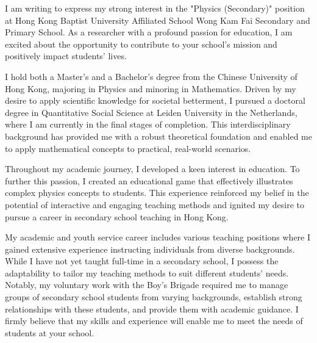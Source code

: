 \documentclass[11pt, a4paper]{awesome-cv}
\begin{document}
\makecvheader[R]

\makecvfooter
  {}%
  {}%
  {}

\makelettertitle

\begin{cvletter}

I am writing to express my strong interest in the "Physics (Secondary)" position at Hong Kong Baptist University Affiliated School Wong Kam Fai Secondary and Primary School. As a researcher with a profound passion for education, I am excited about the opportunity to contribute to your school's mission and positively impact students' lives.

I hold both a Master's and a Bachelor's degree from the Chinese University of Hong Kong, majoring in Physics and minoring in Mathematics. Driven by my desire to apply scientific knowledge for societal betterment, I pursued a doctoral degree in Quantitative Social Science at Leiden University in the Netherlands, where I am currently in the final stages of completion. This interdisciplinary background has provided me with a robust theoretical foundation and enabled me to apply mathematical concepts to practical, real-world scenarios.

Throughout my academic journey, I developed a keen interest in education. To further this passion, I created an educational game that effectively illustrates complex physics concepts to students. This experience reinforced my belief in the potential of interactive and engaging teaching methods and ignited my desire to pursue a career in secondary school teaching in Hong Kong.

My academic and youth service career includes various teaching positions where I gained extensive experience instructing individuals from diverse backgrounds. While I have not yet taught full-time in a secondary school, I possess the adaptability to tailor my teaching methods to suit different students' needs. Notably, my voluntary work with the Boy's Brigade required me to manage groups of secondary school students from varying backgrounds, establish strong relationships with these students, and provide them with academic guidance. I firmly believe that my skills and experience will enable me to meet the needs of students at your school.


\end{cvletter}
\end{document}
